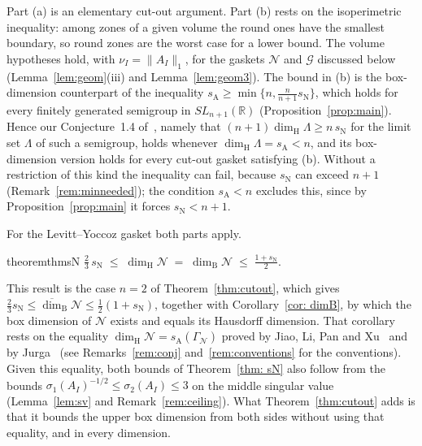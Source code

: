 \documentclass[11pt]{amsart}
\theoremstyle{definition}
\theoremstyle{remark}
\newcommand{\R}{\mathbb R}
\newcommand{\cN}{\mathcal N}
\newcommand{\GN}{\Gamma_{\mathcal N}}
\newcommand{\cG}{\mathcal G}
\newcommand{\udimB}{\overline{\dim}_{\mathrm B}}
\newcommand{\sN}{s_{\mathrm N}}
\newcommand{\sA}{s_{\mathrm A}}
\newcommand{\dimH}{\dim_{\mathrm H}}
\newcommand{\dimB}{\dim_{\mathrm B}}
\newcommand{\norm}[1]{\lVert #1\rVert}
\begin{document}
Part (a) is an elementary cut-out argument. Part (b) rests on the isoperimetric inequality: among zones of a given volume the round ones have the smallest boundary, so round zones are the worst case for a lower bound. 
The volume hypotheses hold, with $\nu_I=\norm{A_I}_1$, for the gaskets $\cN$ and $\cG$ discussed below (Lemma~\ref{lem:geom}(iii) and Lemma~\ref{lem:geom3}). 
The bound in (b) is the box-dimension counterpart of the inequality $\sA\ge\min\{n,\frac n{n+1}\sN\}$, which holds for every finitely generated semigroup in $SL_{n+1}(\R)$ (Proposition~\ref{prop:main}). 
Hence our Conjecture~1.4 of~\cite{DL15EM}, namely that $(n+1)\dimH\Lambda\ge n\,\sN$ for the limit set $\Lambda$ of such a semigroup, holds whenever $\dimH\Lambda=\sA<n$, and its box-dimension version holds for every cut-out gasket satisfying (b). Without a restriction of this kind the inequality can fail, because $\sN$ can exceed $n+1$ (Remark~\ref{rem:minneeded}); the condition $\sA<n$ excludes this, since by Proposition~\ref{prop:main} it forces $\sN<n+1$.

For the Levitt--Yoccoz gasket both parts apply.

\begin{restatable}{theorem}{thmsN}
    \label{thm: sN}
    $\displaystyle\tfrac23\, \sN\;\le\;\dimH\cN\;=\;\dimB\cN\;\le\;\frac{1+ \sN}{2}$.
\end{restatable}

This result is the case $n=2$ of Theorem~\ref{thm:cutout}, which gives $\frac23\sN\le\udimB\cN\le\frac12(1+\sN)$, together with Corollary~\ref{cor: dimB}, by which the box dimension of $\cN$ exists and equals its Hausdorff dimension. That corollary rests on the equality $\dimH\cN=\sA(\GN)$ proved by Jiao, Li, Pan and Xu~\cite{JLPX23} and by Jurga~\cite{Jur26} (see Remarks~\ref{rem:conj} and~\ref{rem:conventions} for the conventions). Given this equality, both bounds of Theorem~\ref{thm: sN} also follow from the bounds $\sigma_1(A_I)^{-1/2}\le\sigma_2(A_I)\le3$ on the middle singular value (Lemma~\ref{lem:sv} and Remark~\ref{rem:ceiling}). What Theorem~\ref{thm:cutout} adds is that it bounds the upper box dimension from both sides without using that equality, and in every dimension.
\end{document}
